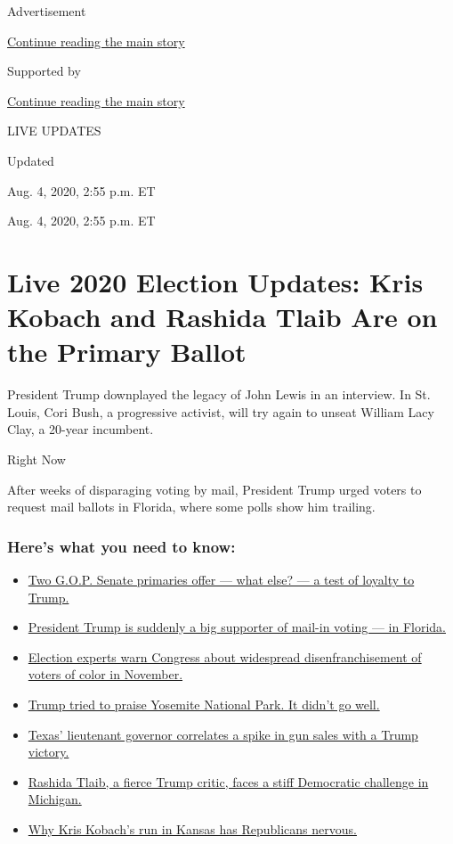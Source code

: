 Advertisement

\protect\hyperlink{after-top}{Continue reading the main story}

Supported by

\protect\hyperlink{after-sponsor}{Continue reading the main story}

LIVE UPDATES

Updated~

Aug. 4, 2020, 2:55 p.m. ET

Aug. 4, 2020, 2:55 p.m. ET

\hypertarget{live-2020-election-updates-kris-kobach-and-rashida-tlaib-are-on-the-primary-ballot}{%
\section{Live 2020 Election Updates: Kris Kobach and Rashida Tlaib Are
on the Primary
Ballot}\label{live-2020-election-updates-kris-kobach-and-rashida-tlaib-are-on-the-primary-ballot}}

President Trump downplayed the legacy of John Lewis in an interview. In
St. Louis, Cori Bush, a progressive activist, will try again to unseat
William Lacy Clay, a 20-year incumbent.

Right Now

After weeks of disparaging voting by mail, President Trump urged voters
to request mail ballots in Florida, where some polls show him trailing.

\hypertarget{heres-what-you-need-to-know}{%
\subsubsection{Here's what you need to
know:}\label{heres-what-you-need-to-know}}

\begin{itemize}
\tightlist
\item
  \protect\hyperlink{link-3924dd44}{Two G.O.P. Senate primaries offer
  --- what else? --- a test of loyalty to Trump.}
\item
  \protect\hyperlink{link-32b39e33}{President Trump is suddenly a big
  supporter of mail-in voting --- in Florida.}
\item
  \protect\hyperlink{link-6d019753}{Election experts warn Congress about
  widespread disenfranchisement of voters of color in November.}
\item
  \protect\hyperlink{link-12734b84}{Trump tried to praise Yosemite
  National Park. It didn't go well.}
\item
  \protect\hyperlink{link-318dd837}{Texas' lieutenant governor
  correlates a spike in gun sales with a Trump victory.}
\item
  \protect\hyperlink{link-6d917025}{Rashida Tlaib, a fierce Trump
  critic, faces a stiff Democratic challenge in Michigan.}
\item
  \protect\hyperlink{link-7c97d7ae}{Why Kris Kobach's run in Kansas has
  Republicans nervous.}
\end{itemize}

